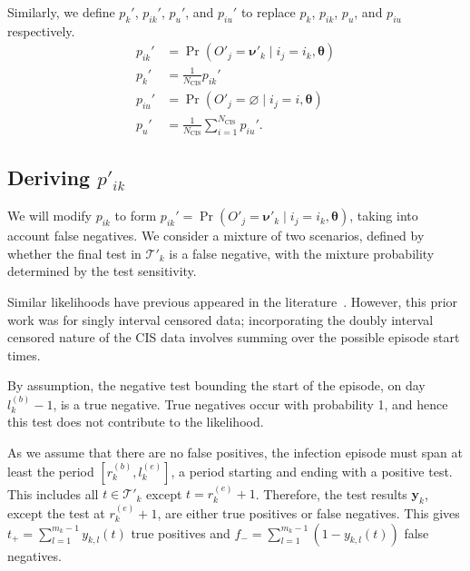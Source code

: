 \documentclass[12pt]{article}
\DeclareMathOperator{\prob}{\mathrm{Pr}}
\renewcommand{\vec}[1]{\bm{#1}}
\newcommand{\Ncis}{N_\text{CIS}}
\newcommand{\sched}{\mathcal{T}}
\begin{document}
Similarly, we define $p_k'$, $p_{ik}'$, $p_u'$, and $p_{iu}'$ to replace $p_k$, $p_{ik}$, $p_u$, and $p_{iu}$ respectively.
\begin{align}
    p_{ik}' &= \prob(O'_j = \vec{\nu}'_k \mid i_j = i_k, \vec{\theta}) \\
    p_k' &= \frac{1}{\Ncis} p_{ik}' \\
    p_{iu}' &= \prob(O'_j = \varnothing \mid i_j = i, \vec{\theta}) \\
    p_u' &= \frac{1}{\Ncis} \sum_{i=1}^{\Ncis} p_{iu}'.
\end{align}

\subsection{Deriving $p'_{ik}$} \label{imperf-test:sec:modifying-p_ia}

We will modify $p_{ik}$ to form $p_{ik}' = \prob(O'_j = \vec{\nu}'_k \mid i_j = i_k, \vec{\theta})$, taking into account false negatives.
We consider a mixture of two scenarios, defined by whether the final test in $\sched'_{k}$ is a false negative, with the mixture probability determined by the test sensitivity.

Similar likelihoods have previous appeared in the literature~\citep[e.g.][eq.\ (2)]{piresIntervalMisclassify}.
However, this prior work was for singly interval censored data; incorporating the doubly interval censored nature of the CIS data involves summing over the possible episode start times.


By assumption, the negative test bounding the start of the episode, on day $l_k^{(b)}-1$, is a true negative.
True negatives occur with probability 1, and hence this test does not contribute to the likelihood.

As we assume that there are no false positives, the infection episode must span at least the period $[r^{(b)}_k, l^{(e)}_k]$, a period starting and ending with a positive test.
This includes all $t \in \sched'_k$ except $t = r_k^{(e)}+1$.
Therefore, the test results $\vec{y}_k$, except the test at $r_k^{(e)}+1$, are either true positives or false negatives.
This gives $t_+ = \sum_{l=1}^{m_k-1} y_{k,l}(t)$ true positives and $f_- = \sum_{l=1}^{m_k-1} (1 - y_{k,l}(t))$ false negatives.
\end{document}
